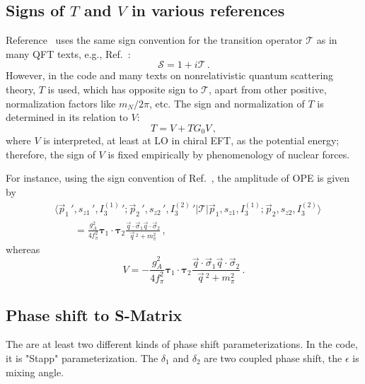 \documentclass{article}
\begin{document}
\subsection{Signs of $T$ and $V$ in various references}

Reference~\cite{Kaiser:1997mw} uses the same sign convention for the transition operator $\mathcal{T}$ as in many QFT texts, e.g., Ref.~\cite{Peskin:1995ev}:
\begin{equation}
    \mathcal{S} = 1 + i \mathcal{T} \, .
\end{equation}
However, in the code and many texts on nonrelativistic quantum scattering theory, $T$ is used, which has opposite sign to $\mathcal{T}$, apart from other positive, normalization factors like $m_N/2\pi$, etc. The sign and normalization of $T$ is determined in its relation to $V$:
\begin{equation}
    T = V + TG_0 V\, ,
\end{equation}
where $V$ is interpreted, at least at LO in chiral EFT, as the potential energy; therefore, the sign of $V$ is fixed empirically by phenomenology of nuclear forces.

For instance, using the sign convention of Ref.~\cite{Kaiser:1997mw}, the amplitude of OPE is given by
\begin{equation}
\begin{split}
    & \langle \vec{p}_1\,', s_{z1}\,', I_{3}^{(1)}\,' ; \vec{p}_2\,' , s_{z2}\,', I_{3}^{(2)}\,' |\mathcal{T} |\vec{p}_1, s_{z1}, I_{3}^{(1)} ; \vec{p}_2 , s_{z2}, I_{3}^{(2)} \rangle \\
    & \qquad = \frac{g_A^2}{4f_\pi^2} \bm{\tau}_1 \cdot \bm{\tau}_2 \frac{\vec{q}\cdot\vec{\sigma}_1  \vec{q}\cdot\vec{\sigma}_2}{\vec{q}\,^2 + m_\pi^2} \, ,
\end{split}
\end{equation}
whereas
\begin{equation}
    V = - \frac{g_A^2}{4f_\pi^2} \bm{\tau}_1 \cdot \bm{\tau}_2 \frac{\vec{q}\cdot\vec{\sigma}_1  \vec{q}\cdot\vec{\sigma}_2}{\vec{q}\,^2 + m_\pi^2} \, .
\end{equation}

\subsection{Phase shift to S-Matrix}
The are at least two different kinds of phase shift parameterizations. In the code, it is "Stapp" parameterization. The $\delta_1$ and $\delta_2$ are two coupled phase shift, the $\epsilon$ is mixing angle.
\end{document}

